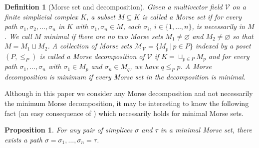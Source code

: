 \documentclass[a4paper,english,cleveref]{article}
\theoremstyle{plain}
\newtheorem{prop}{Proposition}[section]
\newtheorem{definition}{Definition}[section]
\renewcommand{\emptyset}{\varnothing}
\renewcommand{\emptyset}{\varnothing}
\newcounter{li}
\newcommand{\mv}{\mathcal{V}}
\newcommand{\tamal}[1]{\textcolor{blue}{#1}}
\newcommand\michal[1]{\textcolor{ForestGreen}{[ML: #1]}}
\newcommand{\Poset}{P}
\newcommand{\md}{\mathcal{M}}
\begin{document}
\begin{definition}[Morse set and decomposition]\label{def:ms_and_md}
Given a multivector field $\mv$ on a finite simplicial complex $K$, a subset $M\subseteq K$ %
is called
a \emph{Morse set} if 
for every path $\sigma_1, \sigma_2, \ldots, \sigma_n$ in $K$ with $\sigma_1, \sigma_n \in M$, each $\sigma_i$, $i\in \{1,\ldots,n\}$, is necessarily in $M$. 
We call $M$ \emph{minimal} if there are no two Morse sets $M_1\neq \emptyset$
and $M_2\neq \emptyset$ so that $M=M_1\sqcup M_2$.
A collection of Morse sets
$\md_\mv=\{M_p\,|\, p\in \Poset\}$ indexed by a poset $(\Poset, \leq_P)$ is called
a \emph{Morse decomposition} of $\mv$ if 
$K=\sqcup_{p\in \Poset}M_p$
and for every path
$\sigma_1,\ldots, \sigma_n$ with $\sigma_1\in M_p$ and $\sigma_n\in M_q$, we have
$q\leq_P p$. A Morse decomposition is minimum if every Morse set in the decomposition
is minimal.
\end{definition}

Although in this paper we consider any Morse decomposition and not necessarily
the minimum Morse decomposition, it may be interesting to know the following fact
(an easy consequence of \cite[Theorem 7.3]{LKMW2022})
which necessarily holds for minimal Morse sets.
\begin{prop}
    For any pair of simplices $\sigma$ and $\tau$ in a minimal Morse set,
    there exists a path $\sigma=\sigma_1,\ldots, \sigma_n=\tau$.
    \label{prop:minmorse}
\end{prop}
\end{document}
